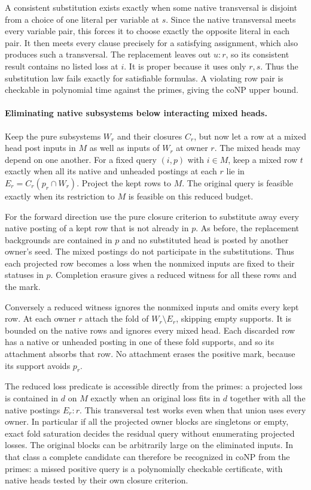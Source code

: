 A consistent substitution exists exactly when some
native transversal is disjoint from a choice of one
literal per variable at $s$. Since the native
transversal meets every variable pair, this forces
it to choose exactly the opposite literal in each
pair. It then meets every clause precisely for a
satisfying assignment, which also produces such a
transversal. The replacement leaves out $u:r$, so
its consistent result contains no listed loss at
$i$. It is proper because it uses only $r,s$.
Thus the substitution law fails exactly for
satisfiable formulas. A violating row pair is
checkable in polynomial time against the primes,
giving the coNP upper bound.

\paragraph{Eliminating native subsystems below interacting mixed heads.}
Keep the pure subsystems $W_r$ and their closures $C_r$,
but now let a row at a mixed head post inputs in $M$
as well as inputs of $W_r$ at owner $r$. The mixed
heads may depend on one another. For a fixed query
$(i,p)$ with $i\in M$, keep a mixed row $t$ exactly
when all its native and unheaded postings at each $r$
lie in $E_r=C_r(p_r\cap W_r)$. Project the kept rows
to $M$. The original query is feasible exactly when
its restriction to $M$ is feasible on this reduced
budget.

For the forward direction use the pure closure criterion
to substitute away every native posting of a kept row
that is not already in $p$. As before, the replacement
backgrounds are contained in $p$ and no substituted head
is posted by another owner's seed. The mixed postings
do not participate in the substitutions. Thus each
projected row becomes a loss when the nonmixed inputs
are fixed to their statuses in $p$. Completion erasure
gives a reduced witness for all these rows and the mark.

Conversely a reduced witness ignores the nonmixed inputs
and omits every kept row. At each owner $r$ attach the
fold of $W_r\setminus E_r$, skipping empty supports.
It is bounded on the native rows and ignores every
mixed head. Each discarded row has a native or unheaded
posting in one of these fold supports, and so its
attachment absorbs that row. No attachment erases the
positive mark, because its support avoids $p_r$.

The reduced loss predicate is accessible directly from
the primes: a projected loss is contained in $d$ on
$M$ exactly when an original loss fits in $d$ together
with all the native postings $E_r:r$. This transversal
test works even when that union uses every owner.
In particular if all the projected owner blocks are
singletons or empty, exact fold saturation decides
the residual query without enumerating projected losses.
The original blocks can be arbitrarily large on the
eliminated inputs. In that class a complete candidate
can therefore be recognized in coNP from the primes:
a missed positive query is a polynomially checkable
certificate, with native heads tested by their own
closure criterion.

